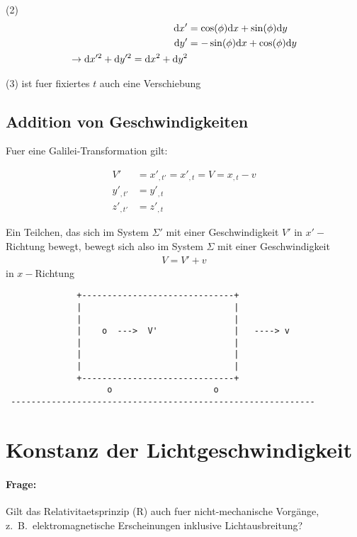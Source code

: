 \documentclass{scrartcl}
\begin{document}
(2)
\begin{align}
  \textrm{d} x'&=\cos(\phi) \textrm{d} x + \sin(\phi) \textrm{d} y \\
  \textrm{d} y'&=-\sin(\phi) \textrm{d} x + \cos(\phi) \textrm{d} y \\
  \rightarrow \textrm{d} x'^2 + \textrm{d} y'^2 = \textrm{d} x^2 + \textrm{d} y^2
\end{align}

(3) ist fuer fixiertes $t$ auch eine Verschiebung

\subsection*{Addition von Geschwindigkeiten}
Fuer eine Galilei-Transformation gilt:

\begin{align}
  V'&=x'_{,t'} = x'_{,t} = V = x_{,t} - v \\
  y'_{,t'} &= y'_{,t} \\
  z'_{,t'} &= z'_{,t}
\end{align}

Ein Teilchen, das sich im System $\Sigma'$ mit einer Geschwindigkeit
$V'$ in $x'-$Richtung bewegt, bewegt sich also im System $\Sigma$ mit
einer Geschwindigkeit
\begin{align}
\label{eqn:addition-geschwindigkeiten}
  V = V' + v
\end{align}
in $x-$Richtung




\begin{verbatim}
              +------------------------------+
              |                              |
              |                              |
              |    o  --->  V'               |   ----> v
              |                              |
              |                              |
              |                              |
              +------------------------------+
                    o                    o
 ------------------------------------------------------------
\end{verbatim}

\section{Konstanz der Lichtgeschwindigkeit}

\paragraph{Frage:}
Gilt das Relativitaetsprinzip (R) auch fuer nicht-mechanische Vorg\"ange,
z.\ B.\ elektromagnetische Erscheinungen inklusive Lichtausbreitung?
\end{document}
